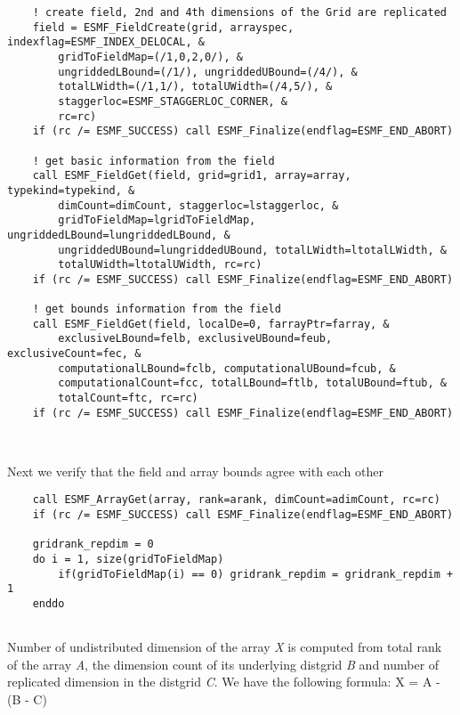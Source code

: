 \begin{verbatim}
    ! create field, 2nd and 4th dimensions of the Grid are replicated
    field = ESMF_FieldCreate(grid, arrayspec, indexflag=ESMF_INDEX_DELOCAL, &
        gridToFieldMap=(/1,0,2,0/), &
        ungriddedLBound=(/1/), ungriddedUBound=(/4/), &
        totalLWidth=(/1,1/), totalUWidth=(/4,5/), &
        staggerloc=ESMF_STAGGERLOC_CORNER, &
        rc=rc)
    if (rc /= ESMF_SUCCESS) call ESMF_Finalize(endflag=ESMF_END_ABORT)

    ! get basic information from the field
    call ESMF_FieldGet(field, grid=grid1, array=array, typekind=typekind, &
        dimCount=dimCount, staggerloc=lstaggerloc, &
        gridToFieldMap=lgridToFieldMap, ungriddedLBound=lungriddedLBound, &
        ungriddedUBound=lungriddedUBound, totalLWidth=ltotalLWidth, &
        totalUWidth=ltotalUWidth, rc=rc)
    if (rc /= ESMF_SUCCESS) call ESMF_Finalize(endflag=ESMF_END_ABORT)

    ! get bounds information from the field
    call ESMF_FieldGet(field, localDe=0, farrayPtr=farray, &
        exclusiveLBound=felb, exclusiveUBound=feub, exclusiveCount=fec, &
        computationalLBound=fclb, computationalUBound=fcub, &
        computationalCount=fcc, totalLBound=ftlb, totalUBound=ftub, &
        totalCount=ftc, rc=rc)
    if (rc /= ESMF_SUCCESS) call ESMF_Finalize(endflag=ESMF_END_ABORT)

 
\end{verbatim}
 

   Next we verify that the field and array bounds agree with each other 

 \begin{verbatim}
    call ESMF_ArrayGet(array, rank=arank, dimCount=adimCount, rc=rc)
    if (rc /= ESMF_SUCCESS) call ESMF_Finalize(endflag=ESMF_END_ABORT)

    gridrank_repdim = 0
    do i = 1, size(gridToFieldMap)
        if(gridToFieldMap(i) == 0) gridrank_repdim = gridrank_repdim + 1
    enddo
 
\end{verbatim}
 

   Number of undistributed dimension of the array {\it X} is computed from
   total rank of the array {\it A}, the dimension count of its underlying distgrid
   {\it B} and number of replicated dimension in the distgrid {\it C}.
   We have the following formula: X = A - (B - C) 

